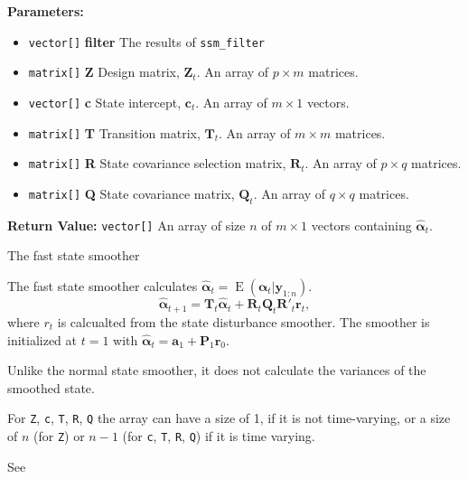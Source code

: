 \documentclass[]{book}
\providecommand{\tightlist}{%
  \setlength{\itemsep}{0pt}\setlength{\parskip}{0pt}}
\DeclareMathOperator{\E}{E}
\newcommand{\mat}[1]{\boldsymbol{#1}}
\renewcommand{\vec}[1]{\boldsymbol{#1}}
\begin{document}
\textbf{Parameters:}

\begin{itemize}
\tightlist
\item
  \texttt{vector{[}{]}} \textbf{filter} The results of
  \texttt{ssm\_filter}
\item
  \texttt{matrix{[}{]}} \textbf{Z} Design matrix, \(\mat{Z}_t\). An
  array of \(p \times m\) matrices.
\item
  \texttt{vector{[}{]}} \textbf{c} State intercept, \(\vec{c}_t\). An
  array of \(m \times 1\) vectors.
\item
  \texttt{matrix{[}{]}} \textbf{T} Transition matrix, \(\mat{T}_t\). An
  array of \(m \times m\) matrices.
\item
  \texttt{matrix{[}{]}} \textbf{R} State covariance selection matrix,
  \(\mat{R} _t\). An array of \(p \times q\) matrices.
\item
  \texttt{matrix{[}{]}} \textbf{Q} State covariance matrix,
  \(\mat{Q}_t\). An array of \(q \times q\) matrices.
\end{itemize}

\textbf{Return Value:} \texttt{vector{[}{]}} An array of size \(n\) of
\(m \times 1\) vectors containing \(\hat{\vec{\alpha}}_t\).

The fast state smoother

The fast state smoother calculates
\(\hat{\vec{\alpha}}_t = \E(\vec{\alpha}_t | \vec{y}_{1:n})\). \[
\hat{\vec{\alpha}}_{t + 1} = \mat{T}_t \hat{\vec{\alpha}}_{t} + \mat{R}_t \mat{Q}_t \mat{R}'_t \vec{r}_t ,
\] where \(r_t\) is calcualted from the state disturbance smoother. The
smoother is initialized at \(t = 1\) with
\(\hat{\vec{\alpha}}_t = \vec{a}_1 + \mat{P}_1 \vec{r}_0\).

Unlike the normal state smoother, it does not calculate the variances of
the smoothed state.

For \texttt{Z}, \texttt{c}, \texttt{T}, \texttt{R}, \texttt{Q} the array
can have a size of 1, if it is not time-varying, or a size of \(n\) (for
\texttt{Z}) or \(n - 1\) (for \texttt{c}, \texttt{T}, \texttt{R},
\texttt{Q}) if it is time varying.

See \autocite[Sec 4.5.3 (eq 4.69)]{DurbinKoopman2012}
\end{document}
